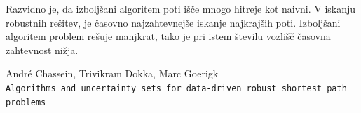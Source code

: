 \documentclass[a4paper, 12 pt]{article}
\theoremstyle{definition} %
\theoremstyle{plain} %
\theoremstyle{definition}
\begin{document}
Razvidno je, da izboljšani algoritem poti išče mnogo hitreje kot naivni. V iskanju robustnih rešitev, je časovno najzahtevnejše iskanje najkrajših poti. Izboljšani algoritem problem rešuje manjkrat, tako je pri istem številu vozlišč časovna zahtevnost nižja.

\newpage


\begin{thebibliography}{9}

    André Chassein, Trivikram Dokka, Marc Goerigk
    \\\texttt{Algorithms and uncertainty sets for data-driven robust shortest path problems}

\end{thebibliography}
\end{document}
